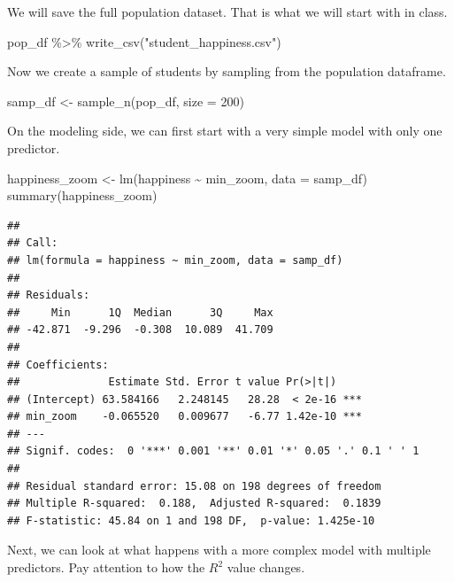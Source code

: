 \documentclass[
]{book}
\newenvironment{Shaded}{\begin{snugshade}}{\end{snugshade}}
\newcommand{\AttributeTok}[1]{\textcolor[rgb]{0.77,0.63,0.00}{#1}}
\newcommand{\DecValTok}[1]{\textcolor[rgb]{0.00,0.00,0.81}{#1}}
\newcommand{\FunctionTok}[1]{\textcolor[rgb]{0.00,0.00,0.00}{#1}}
\newcommand{\NormalTok}[1]{#1}
\newcommand{\OtherTok}[1]{\textcolor[rgb]{0.56,0.35,0.01}{#1}}
\newcommand{\SpecialCharTok}[1]{\textcolor[rgb]{0.00,0.00,0.00}{#1}}
\newcommand{\StringTok}[1]{\textcolor[rgb]{0.31,0.60,0.02}{#1}}
\begin{document}
We will save the full population dataset. That is what we will start with in class.

\begin{Shaded}
\begin{Highlighting}[]
\NormalTok{pop\_df }\SpecialCharTok{\%\textgreater{}\%} \FunctionTok{write\_csv}\NormalTok{(}\StringTok{"student\_happiness.csv"}\NormalTok{)}
\end{Highlighting}
\end{Shaded}

Now we create a sample of students by sampling from the population dataframe.

\begin{Shaded}
\begin{Highlighting}[]
\NormalTok{samp\_df }\OtherTok{\textless{}{-}} \FunctionTok{sample\_n}\NormalTok{(pop\_df, }\AttributeTok{size =} \DecValTok{200}\NormalTok{)}
\end{Highlighting}
\end{Shaded}

On the modeling side, we can first start with a very simple model with only one predictor.

\begin{Shaded}
\begin{Highlighting}[]
\NormalTok{happiness\_zoom }\OtherTok{\textless{}{-}} \FunctionTok{lm}\NormalTok{(happiness }\SpecialCharTok{\textasciitilde{}}\NormalTok{ min\_zoom, }\AttributeTok{data =}\NormalTok{ samp\_df)}
\FunctionTok{summary}\NormalTok{(happiness\_zoom)}
\end{Highlighting}
\end{Shaded}

\begin{verbatim}
## 
## Call:
## lm(formula = happiness ~ min_zoom, data = samp_df)
## 
## Residuals:
##     Min      1Q  Median      3Q     Max 
## -42.871  -9.296  -0.308  10.089  41.709 
## 
## Coefficients:
##              Estimate Std. Error t value Pr(>|t|)    
## (Intercept) 63.584166   2.248145   28.28  < 2e-16 ***
## min_zoom    -0.065520   0.009677   -6.77 1.42e-10 ***
## ---
## Signif. codes:  0 '***' 0.001 '**' 0.01 '*' 0.05 '.' 0.1 ' ' 1
## 
## Residual standard error: 15.08 on 198 degrees of freedom
## Multiple R-squared:  0.188,  Adjusted R-squared:  0.1839 
## F-statistic: 45.84 on 1 and 198 DF,  p-value: 1.425e-10
\end{verbatim}

Next, we can look at what happens with a more complex model with multiple predictors. Pay attention to how the \(R^2\) value changes.
\end{document}
